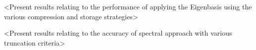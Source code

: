 {\color{blue} <Present results relating to the performance of applying the Eigenbasis using the various compression and storage strategies> }

{\color{blue} <Present results relating to the accuracy of spectral approach with various truncation criteria> }